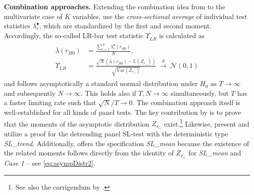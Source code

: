 \textbf{Combination approaches.} Extending the combination idea from \citet{ImPesaranShin2003} to the multivariate case of $ K $ variables, \citet{LarssonEtAl2001} use the \textit{cross-sectional average} of individual test statistics $ \lambda^\bullet_i $, which are standardized by the first and second moment. Accordingly, the so-called LR-bar test statistic $ \Upsilon_{\overline{LR}} $ is calculated as
\begin{align} \label{eq:LRbar}
\begin{split}
	\overline{\lambda} (r_{H0}) & =\frac{ \sum_{i=1}^{N} \lambda^\bullet_i \left( r_{H0} \right) }{N}, \\
	\Upsilon_{\overline{LR}} & = \frac{\sqrt{N} \left( \overline{\lambda} (r_{H0}) - \mathbb{E}\left( Z_{r_\perp} \right) \right) }{ \sqrt{ \text{Var}\left( Z_{r_\perp} \right) } } \ \overset{d}{\longrightarrow} \ \mathcal{N}(0,1)
\end{split}
\end{align}
and follows asymptotically a standard normal distribution under $ H_0 $ as $ T \to \infty $ and subsequently $ N \to \infty $. This holds also if $ T,N \to \infty $ simultaneously, but $ T $ has a faster limiting rate such that $ \sqrt{N}/T \to 0 $. The combination approach itself is well-established for all kinds of panel tests. The key contribution by \citet{LarssonEtAl2001} is to prove that the moments of the asymptotic distribution $ Z_{r_\perp} $ exist.\footnote{See also the corrigendum by \citet{OersalDroge2011}.} Likewise, \citet{OersalDroge2014} present and utilize a proof for the detrending panel SL-test with the deterministic type \textit{SL\_trend}. Additionally,  offers the specification \textit{SL\_mean} because the existence of the related moments follows directly from the identity of $ Z_{r_\perp} $ for \textit{SL\_mean} and \textit{Case 1} -- see \eqref{eq:asympDistr2}. 

